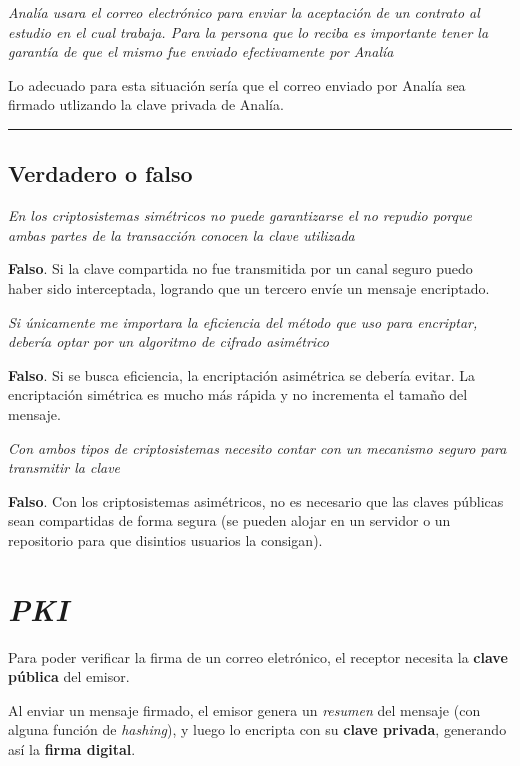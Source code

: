\vspace*{5mm}
\emph{Analía usara el correo electrónico para enviar la aceptación de un contrato al estudio en el cual trabaja. Para la persona que lo reciba es importante tener la garantía de que el mismo fue enviado efectivamente por Analía} 

Lo adecuado para esta situación sería que el correo enviado por Analía sea firmado utlizando la clave privada de Analía.

\vspace*{5mm}
\rule{.9\linewidth}{0.3mm}

\subsection{Verdadero o falso}

\emph{En los criptosistemas simétricos no puede garantizarse el no repudio porque ambas partes de la transacción conocen la clave utilizada} 

\textbf{Falso}. Si la clave compartida no fue transmitida por un canal seguro puedo haber sido interceptada, logrando que un tercero envíe un mensaje encriptado. 

\vspace*{5mm}
\emph{Si únicamente me importara la eficiencia del método que uso para encriptar, debería optar por un algoritmo de cifrado asimétrico} 

\textbf{Falso}. Si se busca eficiencia, la encriptación asimétrica se debería evitar. La encriptación simétrica es mucho más rápida y no incrementa el tamaño del mensaje. 

\vspace*{5mm}
\emph{Con ambos tipos de criptosistemas necesito contar con un mecanismo seguro para transmitir la clave} 

\textbf{Falso}. Con los criptosistemas asimétricos, no es necesario que las claves públicas sean compartidas de forma segura (se pueden alojar en un servidor o un repositorio para que disintios usuarios la consigan).

\section{\emph{PKI}}

Para poder verificar la firma de un correo eletrónico, el receptor necesita la \textbf{clave pública} del emisor. 

Al enviar un mensaje firmado, el emisor genera un \emph{resumen} del mensaje (con alguna función de \emph{hashing}), y luego lo encripta con su \textbf{clave privada}, generando así la \textbf{firma digital}. 


